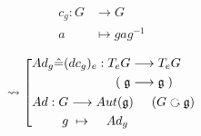 \documentclass[11pt]{amsart}
\numberwithin{equation}{section}
\theoremstyle{plain}
\theoremstyle{plain}
\numberwithin{equation}{section}
\theoremstyle{remark}
\begin{document}
\begin{minipage}[t]{.5\textwidth}
	
	\begin{equation*}
	\begin{aligned}
		c_g:G&\longrightarrow G\\
		a &\mapsto gag^{-1}
	\end{aligned}
	\end{equation*}
	
	\begin{equation*}
	\rightsquigarrow \left[
	\begin{lgathered}
	\begin{aligned}
		Ad_g\hat{=}(dc_g)_e:T_eG&\longrightarrow T_eG\\
		(\;\mathfrak{g}&\longrightarrow \mathfrak{g}\;)
	\end{aligned}\\
	\begin{aligned}
	Ad:G&\longrightarrow Aut(\mathfrak{g})\hspace{0.5cm}(G \text{ \rotatebox[origin=c]{270}{$\circlearrowleft$} } \mathfrak{g})\\
	g &\;\mapsto \hspace{0.4cm} Ad_g
	\end{aligned}
	\end{lgathered} \right.
	\end{equation*}
	

\end{minipage}
\end{document}
